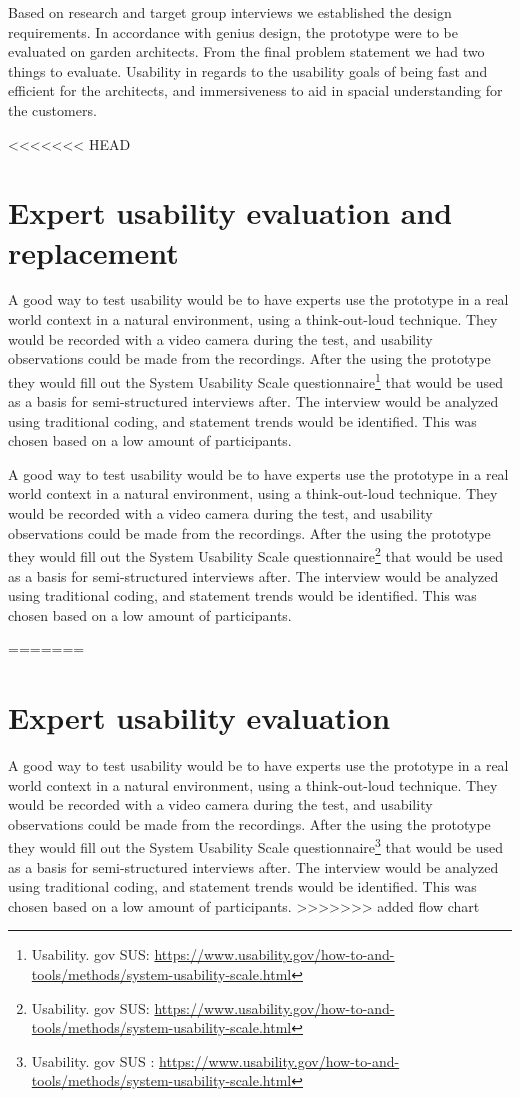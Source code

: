 Based on research and target group interviews we established the design requirements. In accordance with genius design, the prototype were to be evaluated on garden architects. From the final problem statement we had two things to evaluate. Usability in regards to the usability goals of being fast and efficient for the architects, and immersiveness to aid in spacial understanding for the customers.

<<<<<<< HEAD
\section{Expert usability evaluation and replacement}
A good way to test usability would be to have experts use the prototype in a real world context in a natural environment, using a think-out-loud technique. They would be recorded with a video camera during the test, and usability observations could be made from the recordings. After the using the prototype they would fill out the System Usability Scale questionnaire\footnote{Usability. gov SUS:  \url{https://www.usability.gov/how-to-and-tools/methods/system-usability-scale.html}} that would be used as a basis for semi-structured interviews after. The interview would be analyzed using traditional coding, and statement trends would be identified. This was chosen based on a low amount of participants.

A good way to test usability would be to have experts use the prototype in a real world context in a natural environment, using a think-out-loud technique. They would be recorded with a video camera during the test, and usability observations could be made from the recordings. After the using the prototype they would fill out the System Usability Scale questionnaire\footnote{Usability. gov SUS: \url{https://www.usability.gov/how-to-and-tools/methods/system-usability-scale.html}} that would be used as a basis for semi-structured interviews after. The interview would be analyzed using traditional coding, and statement trends would be identified. This was chosen based on a low amount of participants.

=======
\section{Expert usability evaluation}
A good way to test usability would be to have experts use the prototype in a real world context in a natural environment, using a think-out-loud technique. They would be recorded with a video camera during the test, and usability observations could be made from the recordings. After the using the prototype they would fill out the System Usability Scale questionnaire\footnote{Usability. gov SUS : \url{https://www.usability.gov/how-to-and-tools/methods/system-usability-scale.html}} that would be used as a basis for semi-structured interviews after. The interview would be analyzed using traditional coding, and statement trends would be identified. This was chosen based on a low amount of participants.
>>>>>>> added flow chart

